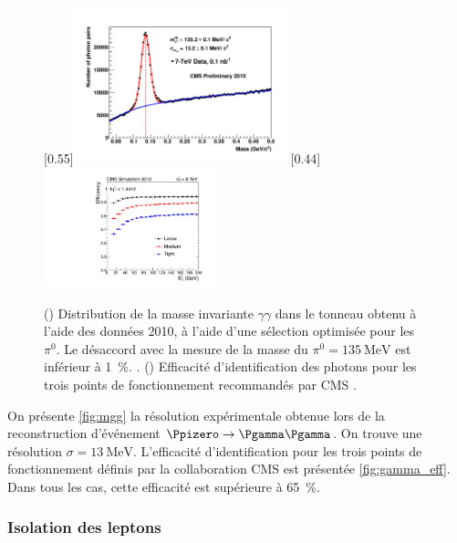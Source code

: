 \begin{figure}[tbp]
    \centering
    \subcaptionbox{\label{fig:mgg}}[0.55\textwidth]{\includegraphics[width=0.55\textwidth]{chapitre3/figs/pf_photons.pdf}} \hfill
    \subcaptionbox{\label{fig:gamma_eff}}[0.44\textwidth]{\includegraphics[width=0.44\textwidth]{chapitre3/figs/photon_eff.pdf}}
    \caption{() Distribution de la masse invariante $\gamma\gamma$ dans le tonneau obtenu à l'aide des données 2010, à l'aide d'une sélection optimisée pour les $\pi^0$. Le désaccord avec la mesure de la masse du $\pi^0 = \SI{135}{\MeV}$ est inférieur à \SI{1}{\%}. \citep{cms_pf_jets}. () Efficacité d'identification des photons pour les trois points de fonctionnement recommandés par CMS \citep{cms_photon_perf}.}
    \label{fig:pf_photons}
\end{figure}

On présente \cref{fig:mgg} la résolution expérimentale obtenue lors de la reconstruction d'événement $\Ppizero \rightarrow \Pgamma \Pgamma$. On trouve une résolution $\sigma = \SI{13}{\MeV}$. L'efficacité d'identification pour les trois points de fonctionnement définis par la collaboration CMS est présentée \cref{fig:gamma_eff}. Dans tous les cas, cette efficacité est supérieure à \SI{65}{\%}.

\subsubsection{Isolation des leptons} \label{sec:lepton_isolation}


